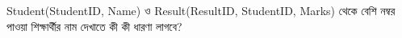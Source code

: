 



Student(StudentID, Name) ও Result(ResultID, StudentID, Marks) থেকে বেশি নম্বর পাওয়া শিক্ষার্থীর নাম দেখাতে কী কী ধারণা লাগবে?




